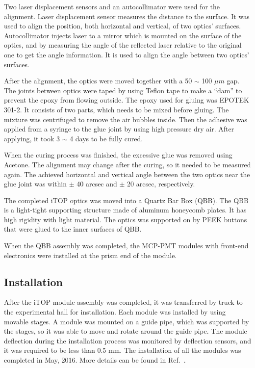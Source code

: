 \documentclass{llncs}
\begin{document}
Two laser displacement sensors and an autocollimator were used for the
alignment. Laser displacement sensor measures the distance to the
surface. It was used to align the position, both horizontal and
vertical, of two optics' surfaces. Autocollimator injects laser to a
mirror which is mounted on the surface of the optics, and by measuring
the angle of the reflected laser relative to the original one to get
the angle information. It is used to align the angle between two
optics' surfaces.

After the alignment, the optics were moved together with a 50 $\sim$
100 $\mu m$ gap. The joints between optics were taped by using Teflon
tape to make a ``dam'' to prevent the epoxy from flowing outside. The
epoxy used for gluing was EPOTEK 301-2. It consists of two parts,
which needs to be mixed before gluing. The mixture was centrifuged to
remove the air bubbles inside. Then the adhesive was applied from a
syringe to the glue joint by using high pressure dry air. After
applying, it took 3 $\sim$ 4 days to be fully cured.

When the curing process was finished, the excessive glue was removed
using Acetone. The alignment may change after the curing, so it needed
to be measured again. The achieved horizontal and vertical angle
between the two optics near the glue joint was within $\pm$ 40 arcsec
and $\pm$ 20 arcsec, respectively.

The completed iTOP optics was moved into a Quartz Bar Box (QBB). The
QBB is a light-tight supporting structure made of aluminum honeycomb
plates. It has high rigidity with light material. The optics was
supported on by PEEK buttons that were glued to the inner surfaces of
QBB.

When the QBB assembly was completed, the MCP-PMT modules with
front-end electronics were installed at the prism end of the module.

\subsection{Installation}

After the iTOP module assembly was completed, it was transferred by
truck to the experimental hall for installation. Each module was
installed by using movable stages. A module was mounted on a guide
pipe, which was supported by the stages, so it was able to move and
rotate around the guide pipe. The module deflection during the
installation process was monitored by deflection sensors, and it was
required to be less than 0.5 mm. The installation of all the modules
was completed in May, 2016. More details can be found in
Ref.~\cite{itop-install}.
\end{document}
